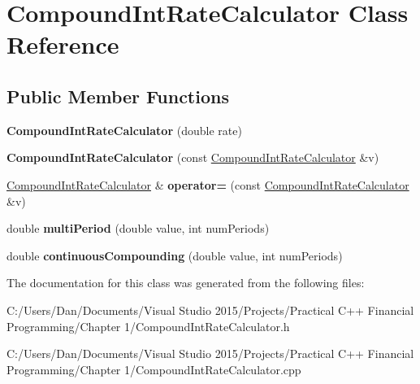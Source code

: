 \hypertarget{class_compound_int_rate_calculator}{}\section{Compound\+Int\+Rate\+Calculator Class Reference}
\label{class_compound_int_rate_calculator}
\subsection*{Public Member Functions}
\begin{DoxyCompactItemize}
\item 
\hypertarget{class_compound_int_rate_calculator_a3b8699fe3e0876ab595c99a8a8ac88e9}{}\label{class_compound_int_rate_calculator_a3b8699fe3e0876ab595c99a8a8ac88e9} 
{\bfseries Compound\+Int\+Rate\+Calculator} (double rate)
\item 
\hypertarget{class_compound_int_rate_calculator_acda3fb10b2c60657a26bddb836550709}{}\label{class_compound_int_rate_calculator_acda3fb10b2c60657a26bddb836550709} 
{\bfseries Compound\+Int\+Rate\+Calculator} (const \hyperlink{class_compound_int_rate_calculator}{Compound\+Int\+Rate\+Calculator} \&v)
\item 
\hypertarget{class_compound_int_rate_calculator_ace7a053e6d625548c9ebcc686944fbdd}{}\label{class_compound_int_rate_calculator_ace7a053e6d625548c9ebcc686944fbdd} 
\hyperlink{class_compound_int_rate_calculator}{Compound\+Int\+Rate\+Calculator} \& {\bfseries operator=} (const \hyperlink{class_compound_int_rate_calculator}{Compound\+Int\+Rate\+Calculator} \&v)
\item 
\hypertarget{class_compound_int_rate_calculator_a8ee2c284d7695112736a711df3ac68ee}{}\label{class_compound_int_rate_calculator_a8ee2c284d7695112736a711df3ac68ee} 
double {\bfseries multi\+Period} (double value, int num\+Periods)
\item 
\hypertarget{class_compound_int_rate_calculator_a452e5b523a2327eeafb243d0918a1cd7}{}\label{class_compound_int_rate_calculator_a452e5b523a2327eeafb243d0918a1cd7} 
double {\bfseries continuous\+Compounding} (double value, int num\+Periods)
\end{DoxyCompactItemize}


The documentation for this class was generated from the following files\+:\begin{DoxyCompactItemize}
\item 
C\+:/\+Users/\+Dan/\+Documents/\+Visual Studio 2015/\+Projects/\+Practical C++ Financial Programming/\+Chapter 1/Compound\+Int\+Rate\+Calculator.\+h\item 
C\+:/\+Users/\+Dan/\+Documents/\+Visual Studio 2015/\+Projects/\+Practical C++ Financial Programming/\+Chapter 1/Compound\+Int\+Rate\+Calculator.\+cpp\end{DoxyCompactItemize}

